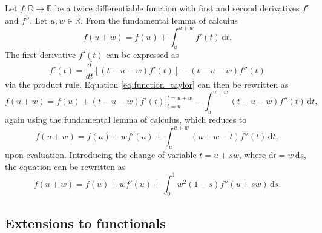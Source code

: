 \documentclass{article}
\begin{document}
Let $f: \mathbb{R} \to \mathbb{R}$ be a twice differentiable
function with first and second derivatives $f'$ and $f''$.
Let $u,w \in \mathbb{R}$. From the fundamental lemma of calculus
%
\begin{equation}
f(u+w) = f(u) + \int_u^{u+w} f'(t) \, \text{d} t.
\label{eq:function_taylor}
\end{equation}
%
The first derivative $f'(t)$ can be expressed as
%
\begin{equation}
f'(t) = \frac{d}{dt}
\left[(t-u-w) f'(t) \right] -
(t-u-w) f''(t)
\end{equation}
%
via the product rule. Equation \eqref{eq:function_taylor}
can then be rewritten as
%
\begin{equation}
f(u+w) = f(u) +
(t-u-w) f'(t) \biggr|_{t=u}^{t=u+w} -
\int_{u}^{u+w} (t-u-w) f''(t) \, \text{d} t,
\end{equation}
again using the fundamental lemma of calculus,
which reduces to
%
\begin{equation}
f(u+w) = f(u) +
w f'(u) + 
\int_{u}^{u+w} (u+w-t) f''(t) \, \text{d} t,
\end{equation}
%
upon evaluation. Introducing the change of variable
$t = u+sw$, where $\text{d}t = w \, \text{d}s$,
the equation can be rewritten as
%
\begin{equation}
f(u+w) = f(u) +
w f'(u)  +
\int_0^1 w^2 (1-s) f''(u + sw) \, \text{d} s.
\label{eq:function_remainder}
\end{equation}

\subsection{Extensions to functionals}
\end{document}
